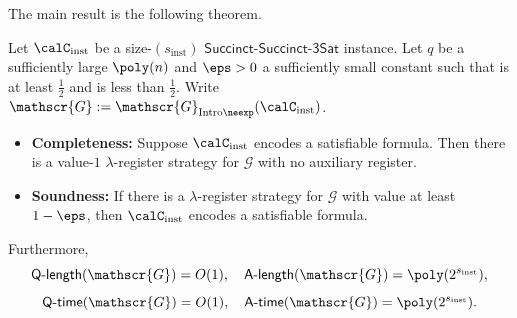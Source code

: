 \documentclass[11pt]{article}
\newcommand{\succinctsquared}{\mathsf{Succinct}\text{-}\mathsf{Succinct}\text{-}\mathsf{3Sat}}
\newcommand{\game}{\mathscr{G}}
\newcommand{\qtime}[1]{\mathsf{Q}\textnormal{-}\mathsf{time}(#1)}
\newcommand{\atime}[1]{\mathsf{A}\textnormal{-}\mathsf{time}(#1)}
\newcommand{\qlength}[1]{\mathsf{Q}\textnormal{-}\mathsf{length}(#1)}
\newcommand{\alength}[1]{\mathsf{A}\textnormal{-}\mathsf{length}(#1)}
\begin{document}
The main result  is the following theorem.

\begin{theorem}\label{thm:main-result-of-this-part}
Let $\calC_{\mathrm{inst}}$ be a size-$(s_{\mathrm{inst}})$ $\succinctsquared$ instance.
Let $q$ be a sufficiently large $\poly(n)$ and $\eps > 0$ a sufficiently small constant such that  is at least $\tfrac{1}{2}$
and  is less than $\tfrac{1}{2}$.
Write $\game := \game_{\mathrm{Intro}\neexp}(\calC_{\mathrm{inst}})$.
\begin{itemize}
\item[$\circ$] \textbf{Completeness:}
		Suppose $\calC_{\mathrm{inst}}$ encodes a satisfiable formula.
		Then there is a value-$1$ $\lambda$-register strategy for $\game$ with no auxiliary register.
\item[$\circ$] \textbf{Soundness:}
		If there is a $\lambda$-register strategy for $\game$ with value at least $1-\eps$,
		then $\calC_{\mathrm{inst}}$ encodes a satisfiable formula.
\end{itemize}
Furthermore,
\begin{equation*}
\qlength{\game} = O(1), \quad
\alength{\game} = \poly(2^{s_\mathrm{inst}}),
\end{equation*}
\begin{equation*}
\qtime{\game} = O(1), \quad
\atime{\game} = \poly(2^{s_\mathrm{inst}}).
\end{equation*}
\end{theorem}
\end{document}
